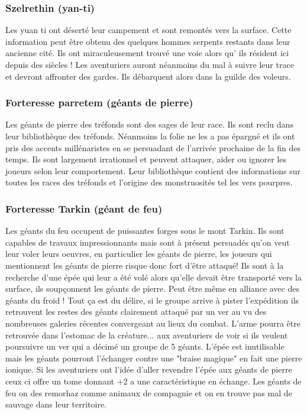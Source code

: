 \subsubsection*{Szelrethin (yan-ti)}

Les yuan ti ont déserté leur campement et sont remontés vers la surface. Cette 
information peut être obtenu des quelques hommes serpents restants dans leur ancienne 
cité. Ils ont miraculeusement trouvé une voie alors qu' ils résident ici depuis des 
siècles ! Les aventuriers auront néanmoins du mal à suivre leur trace et devront 
affronter des gardes. Ils débarquent alors dans la guilde des voleurs. 

\subsubsection*{Forteresse parretem (géants de pierre)}

Les géants de pierre des tréfonds sont des sages de leur race. Ils sont reclu dans 
leur bibliothèque des tréfonds. Néanmoins la folie ne les a pas épargné et ils ont 
pris des accents millénaristes en se persuadant de l'arrivée prochaine de la fin des 
temps. Ils sont largement irrationnel et peuvent attaquer, aider ou ignorer les 
joueurs selon leur comportement. Leur bibliothèque contient des informations sur 
toutes les races des tréfonds et l'origine des monstruosités tel les vers pourpres. 

\subsubsection*{Forteresse Tarkin (géant de feu)}

Les géants du feu occupent de puissantes forges sous le mont Tarkin. Ils sont capables 
de travaux impressionnants mais sont à présent persuadés qu'on veut leur voler leurs 
oeuvres, en particulier les géants de pierre, les joueurs qui mentionnent les géants 
de pierre risque donc fort d'être attaqué! Ils sont à la recherche d'une épée qui leur 
a été volé alors qu'elle devait être transporté vers la surface, ils soupçonnent les 
géants de pierre. Peut être même en alliance avec des géants du froid ! Tout ça est du 
délire, si le groupe arrive à pister l'expédition ils retrouvent les restes des géants 
clairement attaqué par un ver au vu des nombreuses galeries récentes convergeant au 
lieux du combat. L'arme pourra être retrouvée dans l'estomac de la créature... aux 
aventuriers de voir si ils veulent poursuivre un ver qui a décimé un groupe de 5 géants. 
L'épée est inutilisable mais les géants pourront l'échanger contre une "braise magique" 
en fait une pierre ionique. Si les aventuriers ont l'idée d'aller revendre l'épée aux 
géants de pierre ceux ci offre un tome donnant +2 a une caractéristique en échange. Les 
géants de feu on des remorhaz comme animaux de compagnie et on en trouve pas mal de 
sauvage dans leur territoire. 

